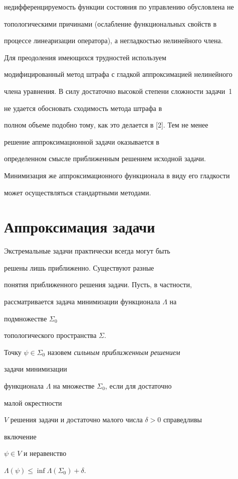 недифференцируемость функции состояния по управлению обусловлена не 


топологическими причинами (ослабление функциональных свойств в 


процессе линеаризации оператора), а негладкостью нелинейного члена. 


 


Для преодоления имеющихся трудностей используем


модифицированный метод штрафа с гладкой аппроксимацией нелинейного 


члена уравнения. В силу достаточно высокой степени сложности задачи~1 


не удается обосновать сходимость метода штрафа в 


полном объеме подобно тому, как это делается в [2]. Тем не менее 


решение аппроксимационной задачи оказывается в 


определенном смысле приближенным решением исходной задачи. 


Минимизация же аппроксимационного функционала в виду его гладкости 


может осуществляться стандартными методами. 


 


 


\section{Аппроксимация задачи} 


 


Экстремальные задачи практически всегда могут быть 


решены лишь приближенно. Существуют разные 


понятия приближенного решения задачи. Пусть, в частности, 


рассматривается задача минимизации функционала $\Lambda$ на 


подмножестве $\Sigma_0$ 


топологического пространства $\Sigma$. 


 


\begin{defn} 


Точку $\psi\in\Sigma_0$ назовем {\it сильным приближенным решением} 


задачи минимизации 


функционала $\Lambda$ на множестве $\Sigma_0$, если для достаточно 


малой окрестности 


$V$ решения задачи и достаточно малого числа $\delta>0$ справедливы 


включение 


$\psi\in V$ и неравенство 


$\Lambda(\psi)\le\inf\Lambda(\Sigma_0)+\delta$. 


\end{defn} 


